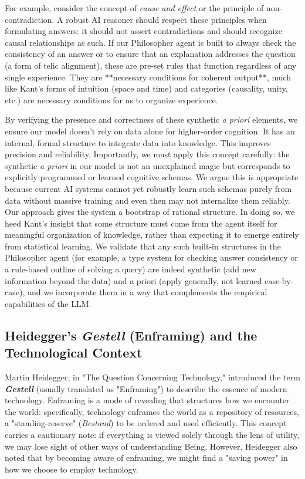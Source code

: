 \documentclass{article}
\begin{document}
For example, consider the concept of \emph{cause and effect} or the principle of non-contradiction. A robust AI reasoner should respect these principles when formulating answers: it should not assert contradictions and should recognize causal relationships as such. If our Philosopher agent is built to always check the consistency of an answer or to ensure that an explanation addresses the question (a form of telic alignment), these are pre-set rules that function regardless of any single experience. They are **necessary conditions for coherent output**, much like Kant's forms of intuition (space and time) and categories (causality, unity, etc.) are necessary conditions for us to organize experience.

By verifying the presence and correctness of these synthetic \emph{a priori} elements, we ensure our model doesn't rely on data alone for higher-order cognition. It has an internal, formal structure to integrate data into knowledge. This improves precision and reliability. Importantly, we must apply this concept carefully: the synthetic \emph{a priori} in our model is not an unexplained magic but corresponds to explicitly programmed or learned cognitive schemas. We argue this is appropriate because current AI systems cannot yet robustly learn such schemas purely from data without massive training and even then may not internalize them reliably. Our approach gives the system a bootstrap of rational structure. In doing so, we heed Kant's insight that some structure must come from the agent itself for meaningful organization of knowledge, rather than expecting it to emerge entirely from statistical learning. We validate that any such built-in structures in the Philosopher agent (for example, a type system for checking answer consistency or a rule-based outline of solving a query) are indeed synthetic (add new information beyond the data) and a priori (apply generally, not learned case-by-case), and we incorporate them in a way that complements the empirical capabilities of the LLM.

\subsection{Heidegger's \emph{Gestell} (Enframing) and the Technological Context}
Martin Heidegger, in "The Question Concerning Technology," introduced the term \textbf{\emph{Gestell}} (usually translated as "Enframing") to describe the essence of modern technology. Enframing is a mode of revealing that structures how we encounter the world: specifically, technology enframes the world as a repository of resources, a "standing-reserve" (\emph{Bestand}) to be ordered and used efficiently. This concept carries a cautionary note: if everything is viewed solely through the lens of utility, we may lose sight of other ways of understanding Being. However, Heidegger also noted that by becoming aware of enframing, we might find a "saving power" in how we choose to employ technology.
\end{document}
